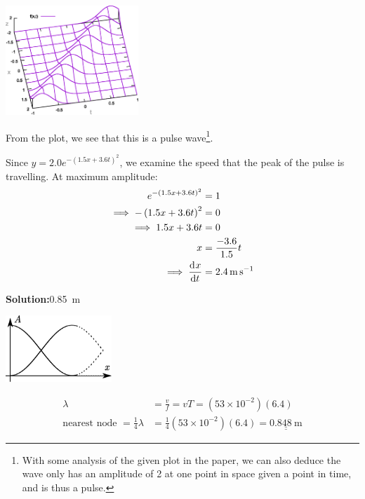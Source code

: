 \documentclass[11pt]{article}
\newcommand*\circled[1]{\tikz[baseline=(char.base)]{
		\node[shape=circle,draw,inner sep=2pt] (char) {#1};}}
\def\doubleunderline#1{\underline{\underline{#1}}}
\newcommand{\solution}[2]{\textbf{Solution:\hspace{1em}\circled{#1}}\hspace{1em}#2\hspace{1em}}
\newlength{\currentparskip}
\begin{document}
\begin{enumerate}[label={[Q\arabic*]},itemsep={1em}]
			\begin{minipage}[c]{5.5cm}
				\includegraphics[width=5cm]{29.eps}
			\end{minipage}%
			\setlength{\currentparskip}{\parskip}		%
			\begin{minipage}{\textwidth - 7cm}
				\setlength{\parskip}{\currentparskip}	%
				From the plot, we see that this is a pulse wave\footnote{With some analysis of the given plot in the paper, we can also deduce the wave only has an amplitude of 2 at one point in space given a point in time, and is thus a pulse.}.
				
				Since $y = 2.0e^{-\left(1.5x+3.6t\right)^2}$, we examine the speed that the peak of the pulse is travelling. At maximum amplitude:
				\begin{align*}
					e^{-\left(1.5x+3.6t\right)^2} &= 1 \\
					\implies -\left(1.5x+3.6t\right)^2 &= 0 \\
					\implies 1.5x+3.6t &= 0 \\
					x &= \frac{-3.6}{1.5}t \\
					\implies \dod{x}{t} &= \SI{2.4}{\meter\per\second}
				\end{align*}
			\end{minipage}
		
		\item \solution{C}{\SI{0.85}{\meter}}
		
			\begin{minipage}[c]{4.5cm}
				\includegraphics[width=4cm]{30.eps}
			\end{minipage}%
			\setlength{\currentparskip}{\parskip}		%
			\begin{minipage}{\textwidth - 6cm}
				\setlength{\parskip}{\currentparskip}	%
				\begin{align*}
					\lambda &= \frac{v}{f} = vT = \left(53\times 10^{-2}\right)\left(6.4\right) \\
					\text{nearest node~} = \frac{1}{4} \lambda &= \frac{1}{4}\left(53\times 10^{-2}\right)\left(6.4\right) = \doubleunderline{\SI{0.848}{\meter}}
				\end{align*}
			\end{minipage}
		

\end{enumerate}
\end{document}
